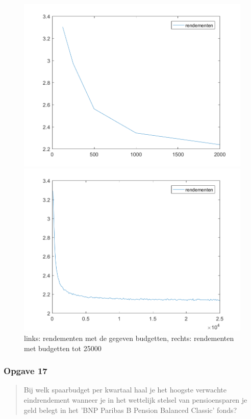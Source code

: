 \documentclass[11pt, a4paper, titlepage, openright]{article}
\begin{document}
		\begin{figure}[H]
		\begin{minipage}[b]{0.49\textwidth}
		\includegraphics[width=1.0\linewidth]{../ex16}
		\end{minipage}
		\hfill
		\begin{minipage}[b]{0.49\textwidth}
		\includegraphics[width=1\linewidth]{../ex16-veel-budgetten}
		\end{minipage}
		\caption{links: rendementen met de gegeven budgetten, rechts: rendementen met budgetten tot 25000}
		\label{fig:ex16}
		\end{figure}
		
	\subsubsection{Opgave 17}
		\begin{quote}
			Bij welk spaarbudget per kwartaal haal je het hoogste verwachte eindrendement wanneer je
			in het wettelijk stelsel van pensioensparen je geld belegt in het 'BNP Paribas B Pension Balanced Classic' fonds?
		\end{quote}
		
\end{document}
